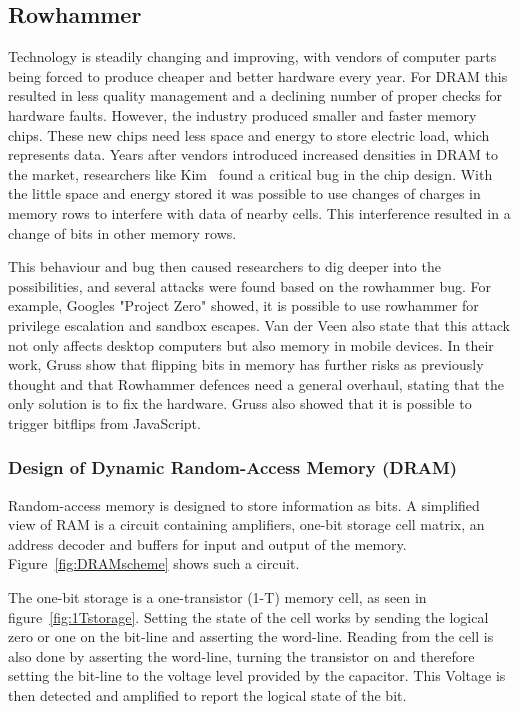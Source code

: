 
\subsection{Rowhammer}

Technology is steadily changing and improving, with vendors of computer parts
being forced to produce cheaper and better hardware every year. For DRAM this
resulted in less quality management and a declining number of proper checks for
hardware faults. However, the industry produced smaller and faster memory chips.
These new chips need less space and energy to store electric load, which
represents data. Years after vendors introduced increased densities in DRAM to
the market, researchers like Kim~\etal\cite{rowhammergeneral} found a critical
bug in the chip design. With the little space and energy stored it was possible
to use changes of charges in memory rows to interfere with data of nearby cells.
This interference resulted in a change of bits in other memory rows.

This behaviour and bug then caused researchers to dig deeper into the
possibilities, and several attacks were found based on the rowhammer bug. For
example, Google\textquotesingle s "Project Zero" showed\cite{projectzerorow}, it
is possible to use rowhammer for privilege escalation and sandbox escapes. Van
der Veen\etal\cite{drammer} also state that this attack not only affects desktop
computers but also memory in mobile devices. In their work,
Gruss\etal\cite{flipinthewall} show that flipping bits in memory has further
risks as previously thought and that Rowhammer defences need a general overhaul,
stating that the only solution is to fix the hardware.
Gruss\etal\cite{rowhammerjs} also showed that it is possible to trigger bitflips
from JavaScript.

\subsubsection{Design of Dynamic Random-Access Memory (DRAM)}

Random-access memory is designed to store information as bits. A simplified view
of RAM is a circuit containing amplifiers, one-bit storage cell matrix, an
address decoder and buffers for input and output of the memory.
Figure~\ref{fig:DRAMscheme} shows such a circuit.

The one-bit storage is a one-transistor (1-T) memory cell, as seen in
figure~\ref{fig:1Tstorage}. Setting the state of the cell works by sending the
logical zero or one on the bit-line and asserting the word-line. Reading from
the cell is also done by asserting the word-line, turning the transistor on and
therefore setting the bit-line to the voltage level provided by the capacitor.
This Voltage is then detected and amplified to report the logical state of the
bit.

